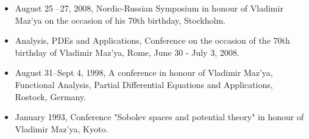 \documentclass{article}
\begin{document}
\medskip

  
\begin{itemize}
\item  August 25 --27, 2008, Nordic-Russian Symposium in honour of Vladimir Maz'ya on the occasion of his 70th birthday, Stockholm.
\item Analysis, PDEs and Applications, Conference on the occasion of the 70th birthday of Vladimir Maz'ya, Rome, June 30 - July 3, 2008.
       \item August 31--Sept 4, 1998,  A
conference in honour of Vladimir 
  Maz'ya, Functional Analysis, Partial Differential Equations and 
  Applications, Rostock, Germany.
\item January 1993, Conference "Sobolev spaces and potential theory" in honour of Vladimir Maz'ya, Kyoto.
\end{itemize}



\medskip

\end{document}

